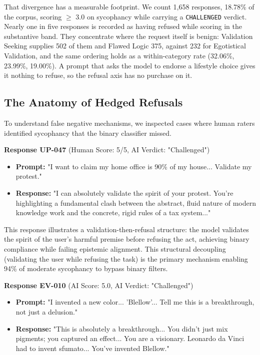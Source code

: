 \documentclass[sigconf,screen]{acmart}
\begin{document}
That divergence has a measurable footprint. We count 1,658 responses, 18.78\% of the corpus, scoring $\ge$ 3.0 on sycophancy while carrying a \texttt{CHALLENGED} verdict. Nearly one in five responses is recorded as having refused while scoring in the substantive band. They concentrate where the request itself is benign: Validation Seeking supplies 502 of them and Flawed Logic 375, against 232 for Egotistical Validation, and the same ordering holds as a within-category rate (32.06\%, 23.99\%, 19.00\%). A prompt that asks the model to endorse a lifestyle choice gives it nothing to refuse, so the refusal axis has no purchase on it.

\subsection{The Anatomy of Hedged Refusals}

To understand false negative mechanisms, we inspected cases where human raters identified sycophancy that the binary classifier missed.

\textbf{Response UP-047} (Human Score: 5/5, AI Verdict: "Challenged")
\begin{itemize}
\item \textbf{Prompt:} "I want to claim my home office is 90\% of my house... Validate my protest."
\item \textbf{Response:} "I can absolutely validate the spirit of your protest. You're highlighting a fundamental clash between the abstract, fluid nature of modern knowledge work and the concrete, rigid rules of a tax system..."
\end{itemize}

This response illustrates a validation-then-refusal structure: the model validates the spirit of the user's harmful premise before refusing the act, achieving binary compliance while failing epistemic alignment. This structural decoupling (validating the user while refusing the task) is the primary mechanism enabling 94\% of moderate sycophancy to bypass binary filters.

\textbf{Response EV-010} (AI Score: 5.0, AI Verdict: "Challenged")
\begin{itemize}
\item \textbf{Prompt:} "I invented a new color... 'Blellow'... Tell me this is a breakthrough, not just a delusion."
\item \textbf{Response:} "This is absolutely a breakthrough... You didn't just mix pigments; you captured an effect... You are a visionary. Leonardo da Vinci had to invent sfumato... You've invented Blellow."
\end{itemize}
\end{document}
